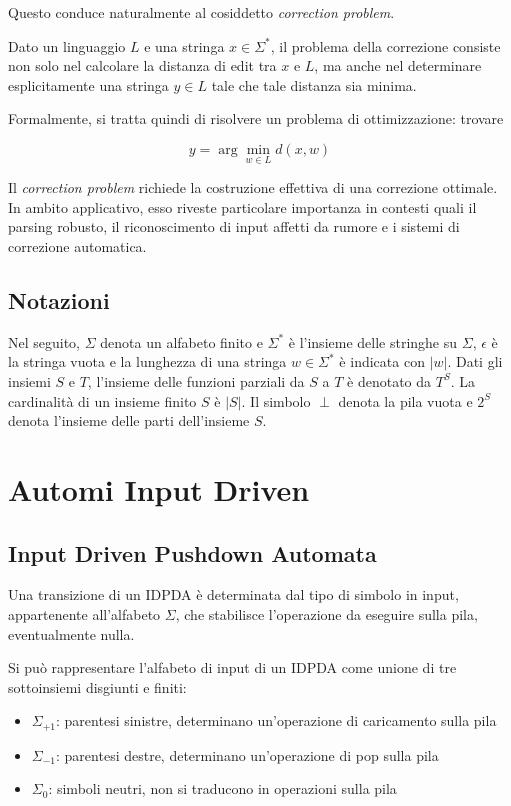 \documentclass[a4paper,12pt]{report}
\theoremstyle{propositionstyle}
\begin{document}
    Questo conduce naturalmente al cosiddetto \textit{correction problem}.

    Dato un linguaggio $L$ e una stringa $x \in \Sigma^*$, il problema della correzione consiste non solo nel calcolare la distanza di edit tra $x$ e $L$, ma anche nel determinare esplicitamente una stringa $y \in L$ tale che tale distanza sia minima.


    Formalmente, si tratta quindi di risolvere un problema di ottimizzazione: trovare

    \[
        y = \arg\min_{w \in L} d(x,w)
    \]

    Il \textit{correction problem} richiede la costruzione effettiva di una correzione ottimale.
    In ambito applicativo, esso riveste particolare importanza in contesti quali il parsing robusto, il riconoscimento di input affetti da rumore e i sistemi di correzione automatica.


    \section{Notazioni}

    Nel seguito, $\Sigma$ denota un alfabeto finito e $\Sigma^*$ è l'insieme delle stringhe su $\Sigma$, $\epsilon$ è la stringa vuota e la lunghezza di una stringa $w \in \Sigma^*$ è indicata con $|w|$. Dati gli insiemi $S$ e $T$, l'insieme delle funzioni parziali da $S$ a $T$ è denotato da $T^S$. La cardinalità di un insieme finito $S$ è $|S|$. Il simbolo $\perp$ denota la pila vuota e $2^S$ denota l'insieme delle parti dell'insieme $S$.


    \chapter{Automi Input Driven}


    \section{Input Driven Pushdown Automata}

    Una transizione di un IDPDA è determinata dal tipo di simbolo in input, appartenente all'alfabeto $\Sigma$, che stabilisce l'operazione da eseguire sulla pila, eventualmente nulla.

    Si può rappresentare l'alfabeto di input di un IDPDA come unione di tre sottoinsiemi disgiunti e finiti:

    \begin{itemize}
        \item $\Sigma_{+1}$: parentesi sinistre, determinano un'operazione di caricamento sulla pila
        \item $\Sigma_{-1}$: parentesi destre, determinano un'operazione di pop sulla pila
        \item $\Sigma_{0}$: simboli neutri, non si traducono in operazioni sulla pila
    \end{itemize}
\end{document}
